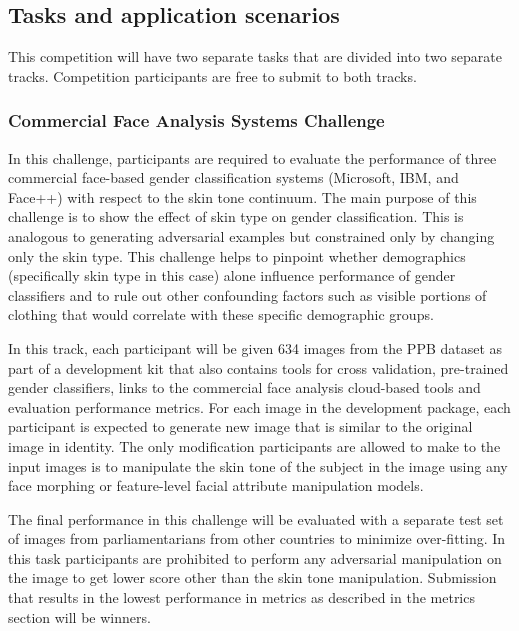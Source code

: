 \documentclass[11pt, oneside]{article}
\begin{document}
\subsection{Tasks and application scenarios}


This competition will have two separate tasks that are divided into two separate tracks. Competition participants are free to submit to both tracks. 

\subsubsection{Commercial Face Analysis Systems Challenge}
In this challenge, participants are required to evaluate the performance of three commercial face-based gender classification systems (Microsoft, IBM, and Face++) with respect to the skin tone continuum. The main purpose of this challenge is to show the effect of skin type on gender classification. This is analogous to generating adversarial examples but constrained only by changing only the skin type. This challenge helps to pinpoint whether demographics (specifically skin type in this case) alone influence performance of gender classifiers and to rule out other confounding factors such as visible portions of clothing that would correlate with these specific demographic groups.

In this track, each participant will be given 634 images from the PPB dataset as part of a development kit that also contains tools for cross validation, pre-trained gender classifiers, links to the commercial face analysis cloud-based tools and evaluation performance metrics. For each image in the development package, each participant is expected to generate new image that is similar to the original image in identity. The only modification participants are allowed to make to the input images is to manipulate the skin tone of the subject in the image using any face morphing or feature-level facial attribute manipulation models. 

The final performance in this challenge will be evaluated with a separate test set of images from parliamentarians from other countries to minimize over-fitting. In this task participants are prohibited to perform any adversarial manipulation on the image to get lower score other than the skin tone manipulation. Submission that results in the lowest performance in metrics as described in the metrics section will be winners.
 
\end{document}

